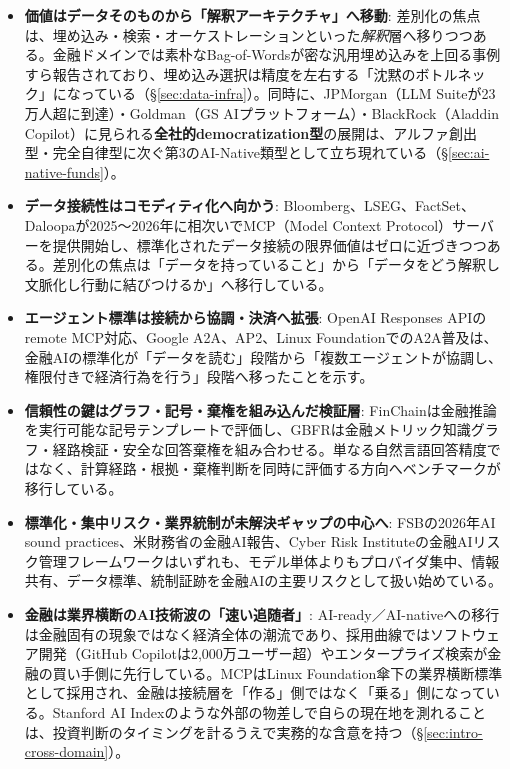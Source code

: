 \begin{itemize}
  \item \textbf{価値はデータそのものから「解釈アーキテクチャ」へ移動}: 差別化の焦点は、埋め込み・検索・オーケストレーションといった\emph{解釈}層へ移りつつある。金融ドメインでは素朴なBag-of-Wordsが密な汎用埋め込みを上回る事例すら報告されており、埋め込み選択は精度を左右する「沈黙のボトルネック」になっている（\S\ref{sec:data-infra}）。同時に、JPMorgan（LLM Suiteが23万人超に到達）・Goldman（GS AIプラットフォーム）・BlackRock（Aladdin Copilot）に見られる\textbf{全社的democratization型}の展開は、アルファ創出型・完全自律型に次ぐ第3のAI-Native類型として立ち現れている（\S\ref{sec:ai-native-funds}）。
  \item \textbf{データ接続性はコモディティ化へ向かう}: Bloomberg、LSEG、FactSet、Daloopaが2025〜2026年に相次いでMCP（Model Context Protocol）サーバーを提供開始し\cite{factset_mcp_nd}、標準化されたデータ接続の限界価値はゼロに近づきつつある。差別化の焦点は「データを持っていること」から「データをどう解釈し文脈化し行動に結びつけるか」へ移行している。
  \item \textbf{エージェント標準は接続から協調・決済へ拡張}: OpenAI Responses APIのremote MCP対応\cite{x01openai2025responsesmcp}、Google A2A\cite{x01google2025a2a}、AP2\cite{x01google2025ap2}、Linux FoundationでのA2A普及\cite{x01linuxfoundation2026a2a}は、金融AIの標準化が「データを読む」段階から「複数エージェントが協調し、権限付きで経済行為を行う」段階へ移ったことを示す。
  \item \textbf{信頼性の鍵はグラフ・記号・棄権を組み込んだ検証層}: FinChainは金融推論を実行可能な記号テンプレートで評価し\cite{x05finchain2025}、GBFRは金融メトリック知識グラフ・経路検証・安全な回答棄権を組み合わせる\cite{x05gbfr2026}。単なる自然言語回答精度ではなく、計算経路・根拠・棄権判断を同時に評価する方向へベンチマークが移行している。
  \item \textbf{標準化・集中リスク・業界統制が未解決ギャップの中心へ}: FSBの2026年AI sound practices\cite{x07fsbsound2026}、米財務省の金融AI報告\cite{x07treasuryai2024}、Cyber Risk Instituteの金融AIリスク管理フレームワーク\cite{x07crifsairmf2026}はいずれも、モデル単体よりもプロバイダ集中、情報共有、データ標準、統制証跡を金融AIの主要リスクとして扱い始めている。
  \item \textbf{金融は業界横断のAI技術波の「速い追随者」}: AI-ready／AI-nativeへの移行は金融固有の現象ではなく経済全体の潮流であり、採用曲線ではソフトウェア開発（GitHub Copilotは2,000万ユーザー超\cite{y01techcrunch2025copilot20m}）やエンタープライズ検索が金融の買い手側に先行している。MCPはLinux Foundation傘下の業界横断標準として採用され\cite{y01linuxfoundation2025aaif}、金融は接続層を「作る」側ではなく「乗る」側になっている。Stanford AI Index\cite{y01stanfordhai2025aiindex}のような外部の物差しで自らの現在地を測れることは、投資判断のタイミングを計るうえで実務的な含意を持つ（\S\ref{sec:intro-cross-domain}）。

\end{itemize}
